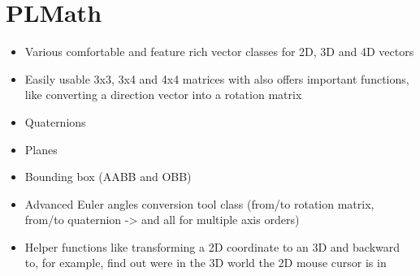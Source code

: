 \section{PLMath}
\begin{itemize}
\item{Various comfortable and feature rich vector classes for 2D, 3D and 4D vectors}
\item{Easily usable 3x3, 3x4 and 4x4 matrices with also offers important functions, like converting a direction vector into a rotation matrix}
\item{Quaternions}
\item{Planes}
\item{Bounding box (AABB and OBB)}
\item{Advanced Euler angles conversion tool class (from/to rotation matrix, from/to quaternion -> and all for multiple axis orders)}
\item{Helper functions like transforming a 2D coordinate to an 3D and backward to, for example, find out were in the 3D world the 2D mouse cursor is in}
\end{itemize}
